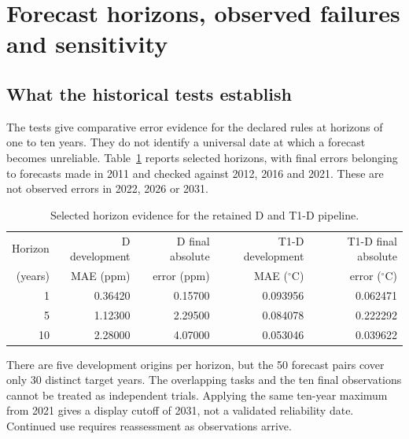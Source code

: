 \documentclass[11pt,a4paper]{article}
\newcommand{\p}[2]{#2\par}
\newcommand{\txt}[2]{#2}
\newcommand{\degC}{\ensuremath{{}^{\circ}\mathrm{C}}}
\begin{document}
\section{Forecast horizons, observed failures and sensitivity}\label{sec:reliability}
\subsection{What the historical tests establish}
\p{HOR01}{The tests give comparative error evidence for the declared rules at horizons of one to ten years. They do not identify a universal date at which a forecast becomes unreliable. Table~\ref{tab:horizons} reports selected horizons, with final errors belonging to forecasts made in 2011 and checked against 2012, 2016 and 2021. These are not observed errors in 2022, 2026 or 2031.}
\begin{table}[H]\centering\small
\caption{\txt{TC09}{Selected horizon evidence for the retained D and T1-D pipeline.}}\label{tab:horizons}
\begin{tabular}{r r r r r}\toprule
Horizon & D development & D final absolute & T1-D development & T1-D final absolute\\
(years) & MAE (ppm) & error (ppm) & MAE (\degC) & error (\degC)\\\midrule
1 & 0.36420 & 0.15700 & 0.093956 & 0.062471\\
5 & 1.12300 & 2.29500 & 0.084078 & 0.222292\\
10 & 2.28000 & 4.07000 & 0.053046 & 0.039622\\\bottomrule
\end{tabular}
\end{table}
\p{HOR02}{There are five development origins per horizon, but the 50 forecast pairs cover only 30 distinct target years. The overlapping tasks and the ten final observations cannot be treated as independent trials. Applying the same ten-year maximum from 2021 gives a display cutoff of 2031, not a validated reliability date. Continued use requires reassessment as observations arrive.}
\end{document}

